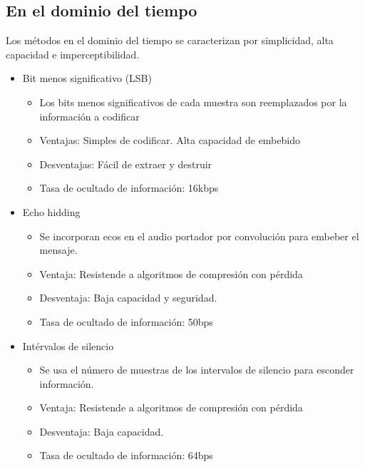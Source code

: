 \documentclass[conference,a4paper,10pt, oneside,final]{tfmpd}
\begin{document}
\subsection{En el dominio del tiempo}
Los métodos en el dominio del tiempo se caracterizan por simplicidad, alta capacidad e imperceptibilidad.
\begin{itemize}
 \item Bit menos significativo (LSB)
 \begin{itemize}
 \item Los bits menos significativos de cada muestra son reemplazados por la información a codificar
 \item Ventajas: Simples de codificar. Alta capacidad de embebido
 \item Desventajas: Fácil de extraer y destruir
 \item Tasa de ocultado de información: 16kbps
 \end{itemize}
 \item Echo hidding
  \begin{itemize}
 \item Se incorporan ecos en el audio portador por convolución para embeber el mensaje.
 \item Ventaja: Resistende a algoritmos de compresión con pérdida
 \item Desventaja: Baja capacidad y seguridad.
 \item Tasa de ocultado de información: 50bps
 \end{itemize}
 \item Intérvalos de silencio
  \begin{itemize}
 \item Se usa el número de muestras de los intervalos de silencio para esconder información.
 \item Ventaja: Resistende a algoritmos de compresión con pérdida
 \item Desventaja: Baja capacidad.
 \item Tasa de ocultado de información: 64bps
 \end{itemize}
\end{itemize}
\end{document}

